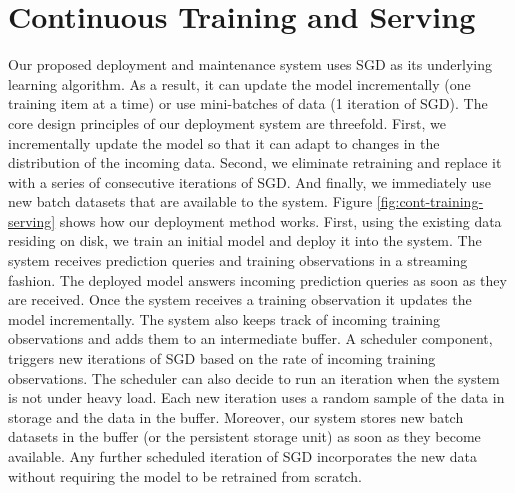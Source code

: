 \documentclass{vldb}
\begin{document}
\section{Continuous Training and Serving} \label{continious-training-serving}
Our proposed deployment and maintenance system uses SGD as its underlying learning algorithm.
As a result, it can update the model incrementally (one training item at a time) or use mini-batches of data (1 iteration of SGD).
The core design principles of our deployment system are threefold.
First, we incrementally update the model so that it can adapt to changes in the distribution of the incoming data.
Second, we eliminate retraining and replace it with a series of consecutive iterations of SGD.
And finally, we immediately use new batch datasets that are available to the system.
Figure \ref{fig:cont-training-serving} shows how our deployment method works.
First, using the existing data residing on disk, we train an initial model and deploy it into the system.
The system receives prediction queries and training observations in a streaming fashion.
The deployed model answers incoming prediction queries as soon as they are received.
Once the system receives a training observation it updates the model incrementally.
The system also keeps track of incoming training observations and adds them to an intermediate buffer.
A scheduler component, triggers new iterations of SGD based on the rate of incoming training observations. 
The scheduler can also decide to run an iteration when the system is not under heavy load.
Each new iteration uses a random sample of the data in storage and the data in the buffer. 
Moreover, our system stores new batch datasets in the buffer (or the persistent storage unit) as soon as they become available.
Any further scheduled iteration of SGD incorporates the new data without requiring the model to be retrained from scratch.
\end{document}
